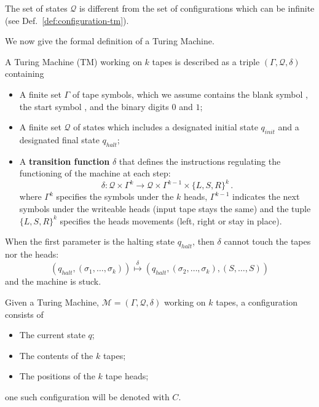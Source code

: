 \begin{note}
	The set of states $\mathcal{Q}$ is different from the set of configurations which can be infinite (see Def.~\ref{def:configuration-tm}).
\end{note}

We now give the formal definition of a Turing Machine.

\begin{definition}
	A Turing Machine (TM) working on $k$ tapes is described as a triple $(\Gamma, \mathcal{Q}, \delta)$ containing
	\begin{itemize}
		\item A finite set \(\Gamma\) of tape symbols, which we assume contains the blank symbol \blank , the start symbol \start , and the binary digits $0$ and $1$;
		\item A finite set \(\mathcal{Q}\) of states which includes a designated initial state \(q_{init}\) and a designated final state \(q_{halt}\);
		\item A \textbf{transition function} \(\delta\) that defines the instructions regulating the functioning of the machine at each step:
		      \begin{equation}
			      \delta : \mathcal{Q} \times \Gamma^k \rightarrow \mathcal{Q} \times \Gamma^{k-1} \times \{L,S,R\}^k \, .
			      \label{eq:transition-function-def}
		      \end{equation}
		      where $\Gamma^k$ specifies the symbols under the $k$ heads, $\Gamma^{k-1}$ indicates the next symbols under the writeable heads (input tape stays the same) and the tuple $\{L,S,R\}^k$ specifies the heads movements (left, right or stay in place).
	\end{itemize}
	\label{def:turing-machine}
\end{definition}
\begin{note}
	When the first parameter is the halting state $q_{halt}$, then $\delta$ cannot touch the tapes nor the heads:
	\[
		(q_{halt}, (\sigma_1, \ldots, \sigma_k) ) \overset{\delta}{\mapsto}  (q_{halt}, (\sigma_2, \ldots, \sigma_k), (S, \ldots, S))
	\]
	and the machine is stuck.
\end{note}
\begin{definition}[Configuration of a TM]
	Given a Turing Machine, $\mathcal{M} = (\Gamma, \mathcal{Q}, \delta)$ working on $k$ tapes, a configuration consists of
	\begin{itemize}
		\item The current state $q$;
		\item The contents of the $k$ tapes;
		\item The positions of the $k$ tape heads;
	\end{itemize}
	one such configuration will be denoted with $C$.
	\label{def:configuration-tm}
\end{definition}
